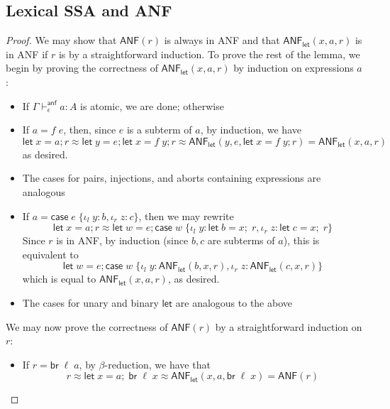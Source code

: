 \documentclass[acmsmall,screen,review]{acmart}
\newcommand{\ms}[1]{\ensuremath{\mathsf{#1}}}
\newcommand{\lto}{:}
\newcommand{\linl}[1]{\iota_l\;{#1}}
\newcommand{\linr}[1]{\iota_r\;{#1}}
\newcommand{\letexpr}[3]{\ensuremath{\ms{let}\;#1 = #2;\;#3}}
\newcommand{\caseexpr}[5]{\ms{case}\;#1\;\{\linl{#2} \lto #3, \linr{#4} \lto #5\}}
\newcommand{\letstmt}[3]{\ensuremath{\ms{let}\;#1 = #2; #3}}
\newcommand{\brb}[2]{\ms{br}\;#1\;#2}
\newcommand{\casestmt}[5]{\ms{case}\;#1\;\{\linl{#2} \lto #3, \linr{#4} \lto #5\}}
\newcommand{\ahasty}[4]{#1 \vdash_{#2}^{\ms{anf}} #3 : {#4}}
\newcommand{\teqv}{\approx}
\newcommand{\toanf}[1]{\ms{ANF}(#1)}
\newcommand{\letanf}[3]{\ms{ANF}_{\ms{let}}(#1, #2, #3)}
\begin{document}
\subsection{Lexical SSA and ANF}

\anfconversion*

\label{proof:anf-conversion}

\begin{proof}
  We may show that $\ms{ANF}(r)$ is always in ANF and that $\ms{ANF}_{\ms{let}}(x, a, r)$ is in ANF
  if $r$ is by a straightforward induction. To prove the rest of the lemma, we begin by proving the
  correctness of $\ms{ANF}_{\ms{let}}(x, a, r)$ by induction on expressions $a$:
  \begin{itemize}
    \item If $\ahasty{\Gamma}{\epsilon}{a}{A}$ is atomic, we are done; otherwise
    \item If $a = f\;e$, then, since $e$ is a subterm of $a$, by induction, we have
    \begin{equation}
      \letstmt{x}{a}{r} 
      \teqv \letstmt{y}{e}{\letstmt{x}{f\;y}{r}}
      \teqv \letanf{y}{e}{\letstmt{x}{f\;y}{r}}
      = \letanf{x}{a}{r}
    \end{equation}
    as desired.
    \item The cases for pairs, injections, and aborts containing expressions are analogous
    \item If $a = \caseexpr{e}{y}{b}{z}{c}$, then we may rewrite
    \begin{equation}
      \letstmt{x}{a}{r} 
      \teqv \letstmt{w}{e}{\casestmt{w}{y}{\letexpr{b}{x}{r}}{z}{\letexpr{c}{x}{r}}}
    \end{equation}
    Since $r$ is in ANF, by induction (since $b, c$ are subterms of $a$), this is equivalent to
    \begin{equation}
      \letstmt{w}{e}
        {\casestmt{w}{y}{\letanf{b}{x}{r}}{z}{\letanf{c}{x}{r}}}
    \end{equation}
    which is equal to $\letanf{x}{a}{r}$, as desired.
    \item The cases for unary and binary $\ms{let}$ are analogous to the above
  \end{itemize}
  We may now prove the correctness of $\toanf{r}$ by a straightforward induction on $r$:
  \begin{itemize}
    \item If $r = \brb{\ell}{a}$, by $\beta$-reduction, we have that
    \begin{equation}
      r \teqv \letexpr{x}{a}{\brb{\ell}{x}} \teqv \letanf{x}{a}{\brb{\ell}{x}} = \toanf{r}

\end{equation}
\end{itemize}
\end{proof}
\end{document}
